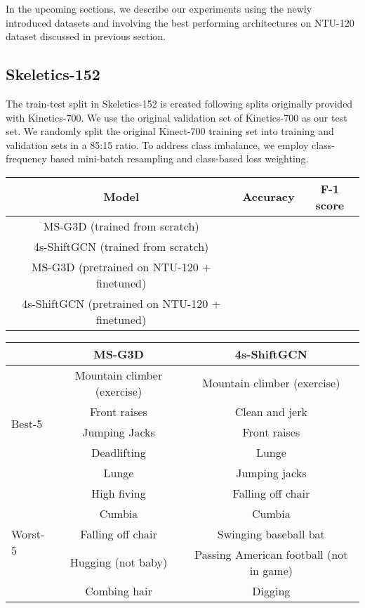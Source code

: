 \documentclass[twocolumn]{svjour3}          \smartqed  \usepackage{graphicx}
\begin{document}
In the upcoming sections, we describe our experiments using the newly introduced datasets and involving the best performing architectures on NTU-120 dataset discussed in previous section.

\subsection{Skeletics-152}
\label{sec:skeleticsres}

The train-test split in Skeletics-152 is created following  splits originally provided with Kinetics-700. We use the original validation set of Kinetics-700 as our test set. We randomly split the original Kinect-700 training set into training and validation sets in a 85:15 ratio. To address class imbalance, we employ class-frequency based mini-batch resampling and class-based loss weighting.

\begin{table}[!t]
\resizebox{\linewidth}{!}
 {\centering
  \begin{tabular}{c|cc}
 \toprule
            Model & Accuracy & F-1 score\\
 \midrule
MS-G3D (trained from scratch)  &    & \\
4s-ShiftGCN (trained from scratch) &   & \\
MS-G3D (pretrained on NTU-120 + finetuned) &   & \\
 4s-ShiftGCN (pretrained on NTU-120 + finetuned)  &    & \\
 \bottomrule
 \end{tabular}
 }
\label{tab:Kinetics-results}
\end{table}

\begin{table}[!t]
    \resizebox{\linewidth}{!}
    {
    \begin{tabular}{lcc}
    \toprule
         & MS-G3D &  4s-ShiftGCN  \\
         \midrule
          \multirow{5}{4.5em}{\centering Best-5} & Mountain climber (exercise) & Mountain climber (exercise) \\ 
          & Front raises & Clean and jerk \\ 
          & Jumping Jacks & Front raises \\ 
          & Deadlifting & Lunge\\ 
          &  Lunge & Jumping jacks\\ 
          \midrule
          \multirow{5}{4.5em}{\centering Worst-5} & High fiving & Falling off chair \\ 
          & Cumbia &  Cumbia \\ 
          & Falling off chair & Swinging baseball bat \\ 
          & Hugging (not baby) & Passing American football (not in game)\\ 
          & Combing hair &  Digging\\ 
          \bottomrule
    \end{tabular}
    }
    \label{tab:top-bottom-skeletics}
\end{table}
\end{document}
